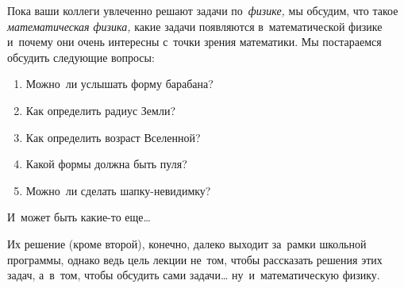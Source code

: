 



Пока ваши коллеги увлеченно решают задачи по~\emph{физике,} мы обсудим, что
такое \emph{математическая физика,} какие задачи появляются в~математической
физике и~почему они очень интересны с~точки зрения математики.
Мы постараемся обсудить следующие вопросы:
\begin{enumerate}
\item Можно~ли услышать форму барабана?
\item Как определить радиус Земли?
\item Как определить возраст Вселенной?
\item Какой формы должна быть пуля?
\item Можно~ли сделать шапку-невидимку?
\end{enumerate}
И~может быть какие-то еще…
 
Их решение (кроме второй), конечно, далеко выходит за~рамки школьной программы,
однако ведь цель лекции не~том, чтобы рассказать решения этих задач, а~в~том,
чтобы обсудить сами задачи… ну~и~математическую физику. 
 
